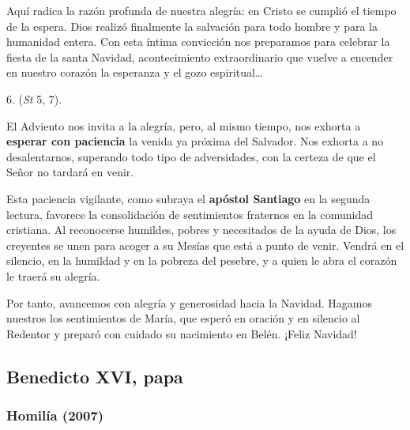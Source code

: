 \begin{body}
					Aquí radica la razón profunda de nuestra alegría: en Cristo se cumplió el tiempo de la espera. Dios realizó finalmente la salvación para todo hombre y para la humanidad entera. Con esta íntima convicción nos preparamos para celebrar la fiesta de la santa Navidad, acontecimiento extraordinario que vuelve a encender en nuestro corazón la esperanza y el gozo espiritual\ldots{}
					
					6.  (\emph{St} 5, 7).
					
					El Adviento nos invita a la alegría, pero, al mismo tiempo, nos exhorta a \textbf{esperar con paciencia} la venida ya próxima del Salvador. Nos exhorta a no desalentarnos, superando todo tipo de adversidades, con la certeza de que el Señor no tardará en venir.
					
					Esta paciencia vigilante, como subraya el \textbf{apóstol Santiago} en la segunda lectura, favorece la consolidación de sentimientos fraternos en la comunidad cristiana. Al reconocerse humildes, pobres y necesitados de la ayuda de Dios, los creyentes se unen para acoger a su Mesías que está a punto de venir. Vendrá en el silencio, en la humildad y en la pobreza del pesebre, y a quien le abra el corazón le traerá su alegría.
					
					Por tanto, avancemos con alegría y generosidad hacia la Navidad. Hagamos nuestros los sentimientos de María, que esperó en oración y en silencio al Redentor y preparó con cuidado su nacimiento en Belén. ¡Feliz Navidad!
				\end{body}
			
			
		\newsection 			

		\subsection{Benedicto XVI, papa}

			\subsubsection{Homilía (2007)} 

				
